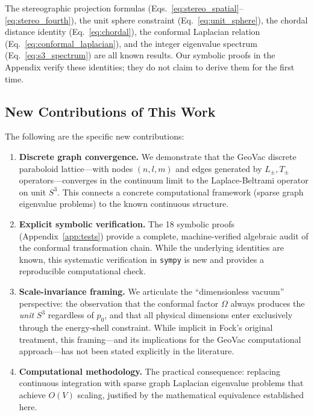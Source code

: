 \documentclass[aps,pra,twocolumn,superscriptaddress,longbibliography]{revtex4-2}
\begin{document}
The stereographic projection formulas (Eqs.~\ref{eq:stereo_spatial}--\ref{eq:stereo_fourth}), the unit sphere constraint (Eq.~\ref{eq:unit_sphere}), the chordal distance identity (Eq.~\ref{eq:chordal}), the conformal Laplacian relation (Eq.~\ref{eq:conformal_laplacian}), and the integer eigenvalue spectrum (Eq.~\ref{eq:s3_spectrum}) are all known results. Our symbolic proofs in the Appendix verify these identities; they do not claim to derive them for the first time.

\subsection{New Contributions of This Work}

The following are the specific new contributions:

\begin{enumerate}
\item \textbf{Discrete graph convergence.} We demonstrate that the GeoVac discrete paraboloid lattice---with nodes $(n, l, m)$ and edges generated by $L_\pm, T_\pm$ operators---converges in the continuum limit to the Laplace-Beltrami operator on unit $S^3$. This connects a concrete computational framework (sparse graph eigenvalue problems) to the known continuous structure.

\item \textbf{Explicit symbolic verification.} The 18 symbolic proofs (Appendix~\ref{app:tests}) provide a complete, machine-verified algebraic audit of the conformal transformation chain. While the underlying identities are known, this systematic verification in \texttt{sympy} is new and provides a reproducible computational check.

\item \textbf{Scale-invariance framing.} We articulate the ``dimensionless vacuum'' perspective: the observation that the conformal factor $\Omega$ always produces the \textit{unit} $S^3$ regardless of $p_0$, and that all physical dimensions enter exclusively through the energy-shell constraint. While implicit in Fock's original treatment, this framing---and its implications for the GeoVac computational approach---has not been stated explicitly in the literature.

\item \textbf{Computational methodology.} The practical consequence: replacing continuous integration with sparse graph Laplacian eigenvalue problems that achieve $O(V)$ scaling, justified by the mathematical equivalence established here.
\end{enumerate}
\end{document}
